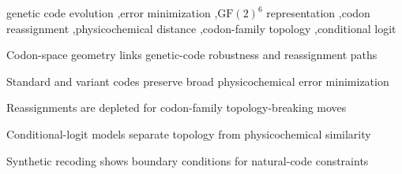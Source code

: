 \documentclass[preprint,11pt,authoryear,a4paper]{elsarticle}
\begin{document}
\begin{frontmatter}
\begin{keyword}
genetic code evolution \sep error minimization \sep $\mathrm{GF}(2)^6$ representation \sep codon reassignment \sep physicochemical distance \sep codon-family topology \sep conditional logit
\end{keyword}

\begin{highlights}
\item Codon-space geometry links genetic-code robustness and reassignment paths
\item Standard and variant codes preserve broad physicochemical error minimization
\item Reassignments are depleted for codon-family topology-breaking moves
\item Conditional-logit models separate topology from physicochemical similarity
\item Synthetic recoding shows boundary conditions for natural-code constraints
\end{highlights}

\end{frontmatter}





\end{document}
